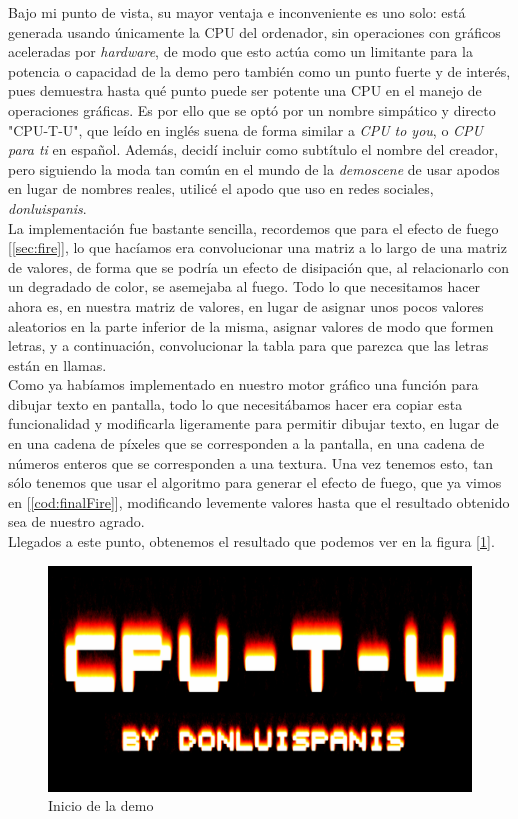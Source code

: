 Bajo mi punto de vista, su mayor ventaja e inconveniente es uno solo: está generada usando únicamente la CPU del ordenador, sin operaciones con gráficos aceleradas por \emph{hardware}, de modo que esto actúa como un limitante para la potencia o capacidad de la demo pero también como un punto fuerte y de interés, pues demuestra hasta qué punto puede ser potente una CPU en el manejo de operaciones gráficas. Es por ello que se optó por un nombre simpático y directo "CPU-T-U", que leído en inglés suena de forma similar a \emph{CPU to you}, o \emph{CPU para ti} en español. Además, decidí incluir como subtítulo el nombre del creador, pero siguiendo la moda tan común en el mundo de la \emph{demoscene} de usar apodos en lugar de nombres reales, utilicé el apodo que uso en redes sociales, \emph{donluispanis}.\\

La implementación fue bastante sencilla, recordemos que para el efecto de fuego [\ref{sec:fire}], lo que hacíamos era convolucionar una matriz a lo largo de una matriz de valores, de forma que se podría un efecto de disipación que, al relacionarlo con un degradado de color, se asemejaba al fuego. Todo lo que necesitamos hacer ahora es, en nuestra matriz de valores, en lugar de asignar unos pocos valores aleatorios en la parte inferior de la misma, asignar valores de modo que formen letras, y a continuación, convolucionar la tabla para que parezca que las letras están en llamas.\\

Como ya habíamos implementado en nuestro motor gráfico una función para dibujar texto en pantalla, todo lo que necesitábamos hacer era copiar esta funcionalidad y modificarla ligeramente para permitir dibujar texto, en lugar de en una cadena de píxeles que se corresponden a la pantalla, en una cadena de números enteros que se corresponden a una textura. Una vez tenemos esto, tan sólo tenemos que usar el algoritmo para generar el efecto de fuego, que ya vimos en [\ref{cod:finalFire}], modificando levemente valores hasta que el resultado obtenido sea de nuestro agrado.\\

Llegados a este punto, obtenemos el resultado que podemos ver en la figura [\ref{fig:intro}].\\

\begin{figure}[h]
	\centering
	\includegraphics[width=12cm]{archivos/intro}
	\caption{Inicio de la demo}
	\label{fig:intro}
\end{figure}


